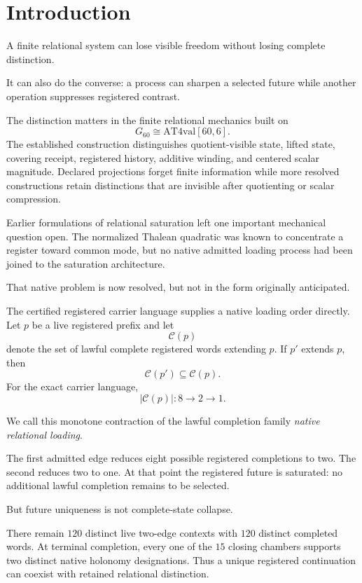 \section{Introduction}

A finite relational system can lose visible freedom without losing
complete distinction.

It can also do the converse: a process can sharpen a selected future
while another operation suppresses registered contrast.

The distinction matters in the finite relational mechanics built on
\[
G_{60}\cong\mathrm{AT4val}[60,6].
\]
The established construction distinguishes quotient-visible state,
lifted state, covering receipt, registered history, additive winding,
and centered scalar magnitude.  Declared projections forget finite
information while more resolved constructions retain distinctions
that are invisible after quotienting or scalar compression.

Earlier formulations of relational saturation left one important
mechanical question open.  The normalized Thalean quadratic was known
to concentrate a register toward common mode, but no native admitted
loading process had been joined to the saturation architecture.

That native problem is now resolved, but not in the form originally
anticipated.

The certified registered carrier language supplies a native loading
order directly.  Let \(p\) be a live registered prefix and let
\[
\mathcal C(p)
\]
denote the set of lawful complete registered words extending \(p\).
If \(p'\) extends \(p\), then
\[
\mathcal C(p')\subseteq\mathcal C(p).
\]
For the exact carrier language,
\[
|\mathcal C(p)|
:
8\longrightarrow2\longrightarrow1.
\]

We call this monotone contraction of the lawful completion family
\emph{native relational loading}.

The first admitted edge reduces eight possible registered completions
to two.  The second reduces two to one.  At that point the registered
future is saturated: no additional lawful completion remains to be
selected.

But future uniqueness is not complete-state collapse.

There remain \(120\) distinct live two-edge contexts with \(120\)
distinct completed words.  At terminal completion, every one of the
\(15\) closing chambers supports two distinct native holonomy
designations.  Thus a unique registered continuation can coexist with
retained relational distinction.

